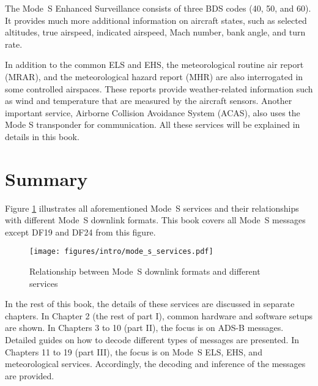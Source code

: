 The Mode~S Enhanced Surveillance consists of three BDS codes (40, 50, and 60). It provides much more additional information on aircraft states, such as selected altitudes, true airspeed, indicated airspeed, Mach number, bank angle, and turn rate.

In addition to the common ELS and EHS, the meteorological routine air report (MRAR), and the meteorological hazard report (MHR) are also interrogated in some controlled airspaces. These reports provide weather-related information such as wind and temperature that are measured by the aircraft sensors. Another important service, Airborne Collision Avoidance System (ACAS), also uses the Mode S transponder for communication. All these services will be explained in details in this book.


\section{Summary}

Figure \ref{fig:mode_s_services} illustrates all aforementioned Mode~S services and their relationships with different Mode~S downlink formats. This book covers all Mode~S messages except DF19 and DF24 from this figure.

\begin{figure}[ht]
  \centering
  \texttt{[image: figures/intro/mode\_s\_services.pdf]}
  \caption{Relationship between Mode~S downlink formats and different services}
  \label{fig:mode_s_services}
\end{figure}

In the rest of this book, the details of these services are discussed in separate chapters. In Chapter 2 (the rest of part I), common hardware and software setups are shown. In Chapters 3 to 10 (part II), the focus is on ADS-B messages. Detailed guides on how to decode different types of messages are presented. In Chapters 11 to 19 (part III), the focus is on Mode~S ELS, EHS, and meteorological services. Accordingly, the decoding and inference of the messages are provided.
